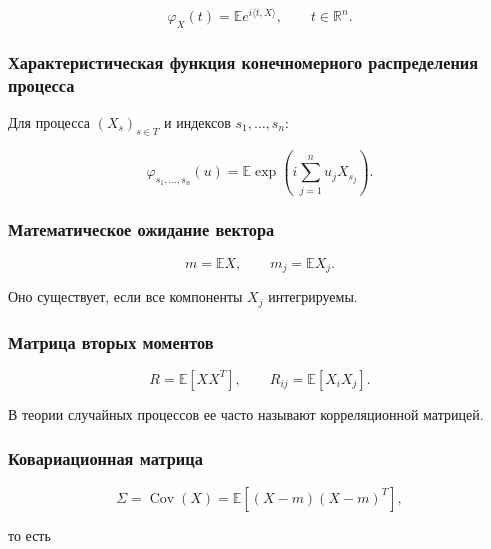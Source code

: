 \documentclass[
  11pt,
  a4paper,
]{article}
\begin{document}
\[
\varphi_X(t)=\mathbb E e^{i\langle t,X\rangle},
\qquad t\in\mathbb R^n.
\]

\subsubsection{Характеристическая функция конечномерного распределения
процесса}\label{ux445ux430ux440ux430ux43aux442ux435ux440ux438ux441ux442ux438ux447ux435ux441ux43aux430ux44f-ux444ux443ux43dux43aux446ux438ux44f-ux43aux43eux43dux435ux447ux43dux43eux43cux435ux440ux43dux43eux433ux43e-ux440ux430ux441ux43fux440ux435ux434ux435ux43bux435ux43dux438ux44f-ux43fux440ux43eux446ux435ux441ux441ux430}

Для процесса \((X_s)_{s\in T}\) и индексов \(s_1,\ldots,s_n\):

\[
\varphi_{s_1,\ldots,s_n}(u)
=
\mathbb E\exp\left(i\sum_{j=1}^n u_jX_{s_j}\right).
\]

\subsubsection{Математическое ожидание
вектора}\label{ux43cux430ux442ux435ux43cux430ux442ux438ux447ux435ux441ux43aux43eux435-ux43eux436ux438ux434ux430ux43dux438ux435-ux432ux435ux43aux442ux43eux440ux430}

\[
m=\mathbb EX,
\qquad
m_j=\mathbb EX_j.
\]

Оно существует, если все компоненты \(X_j\) интегрируемы.

\subsubsection{Матрица вторых
моментов}\label{ux43cux430ux442ux440ux438ux446ux430-ux432ux442ux43eux440ux44bux445-ux43cux43eux43cux435ux43dux442ux43eux432}

\[
R=\mathbb E[XX^T],
\qquad
R_{ij}=\mathbb E[X_iX_j].
\]

В теории случайных процессов ее часто называют корреляционной матрицей.

\subsubsection{Ковариационная
матрица}\label{ux43aux43eux432ux430ux440ux438ux430ux446ux438ux43eux43dux43dux430ux44f-ux43cux430ux442ux440ux438ux446ux430}

\[
\Sigma=\operatorname{Cov}(X)=\mathbb E[(X-m)(X-m)^T],
\]

то есть
\end{document}
